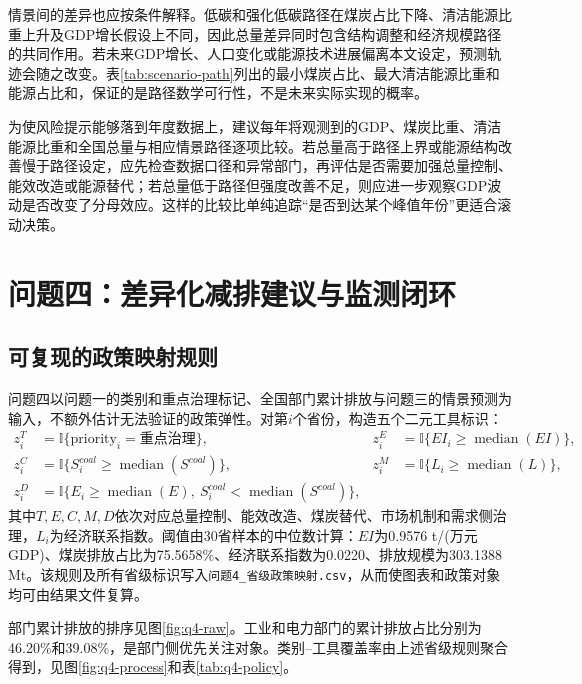 \documentclass[12pt,a4paper]{ctexart}
\theoremstyle{definition}
\theoremstyle{plain}
\theoremstyle{remark}
\begin{document}
情景间的差异也应按条件解释。低碳和强化低碳路径在煤炭占比下降、清洁能源比重上升及GDP增长假设上不同，因此总量差异同时包含结构调整和经济规模路径的共同作用。若未来GDP增长、人口变化或能源技术进展偏离本文设定，预测轨迹会随之改变。表\ref{tab:scenario-path}列出的最小煤炭占比、最大清洁能源比重和能源占比和，保证的是路径数学可行性，不是未来实际实现的概率。

为使风险提示能够落到年度数据上，建议每年将观测到的GDP、煤炭比重、清洁能源比重和全国总量与相应情景路径逐项比较。若总量高于路径上界或能源结构改善慢于路径设定，应先检查数据口径和异常部门，再评估是否需要加强总量控制、能效改造或能源替代；若总量低于路径但强度改善不足，则应进一步观察GDP波动是否改变了分母效应。这样的比较比单纯追踪“是否到达某个峰值年份”更适合滚动决策。
\section{问题四：差异化减排建议与监测闭环}

\subsection{可复现的政策映射规则}
问题四以问题一的类别和重点治理标记、全国部门累计排放与问题三的情景预测为输入，不额外估计无法验证的政策弹性。对第$i$个省份，构造五个二元工具标识：
\begin{equation}
\begin{aligned}
z_{i}^{T}&=\mathbb{I}\{\text{priority}_i=\text{重点治理}\},&
z_{i}^{E}&=\mathbb{I}\{EI_i\geq\operatorname{median}(EI)\},\\
z_{i}^{C}&=\mathbb{I}\{S_{i}^{coal}\geq\operatorname{median}(S^{coal})\},&
z_{i}^{M}&=\mathbb{I}\{L_i\geq\operatorname{median}(L)\},\\
z_{i}^{D}&=\mathbb{I}\{E_i\geq\operatorname{median}(E),\ S_{i}^{coal}<\operatorname{median}(S^{coal})\},
\end{aligned}
\label{eq:policy-map}
\end{equation}
其中$T,E,C,M,D$依次对应总量控制、能效改造、煤炭替代、市场机制和需求侧治理，$L_i$为经济联系指数。阈值由30省样本的中位数计算：$EI$为0.9576 t/(万元 GDP)、煤炭排放占比为75.5658\%、经济联系指数为0.0220、排放规模为303.1388 Mt。该规则及所有省级标识写入\texttt{问题4\_省级政策映射.csv}，从而使图表和政策对象均可由结果文件复算。

部门累计排放的排序见图\ref{fig:q4-raw}。工业和电力部门的累计排放占比分别为46.20\%和39.08\%，是部门侧优先关注对象。类别--工具覆盖率由上述省级规则聚合得到，见图\ref{fig:q4-process}和表\ref{tab:q4-policy}。
\end{document}

